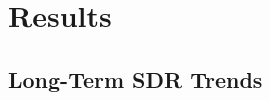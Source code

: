 \documentclass[applsci,article,accept,moreauthors,pdftex]{Definitions/mdpi} %
\providecommand{\DIFaddbegin}{} %
\providecommand{\DIFaddend}{} %
\providecommand{\DIFdelbegin}{} %
\providecommand{\DIFdelend}{} %
\begin{document}
\hypertarget{results}{%
\section{Results}\label{results}}

\DIFdelbegin %
\DIFdelend \DIFaddbegin \hypertarget{long-term-sdr-trends}{%
\subsection{Long-Term SDR Trends}\label{long-term-sdr-trends}}
\DIFaddend 
\end{document}
